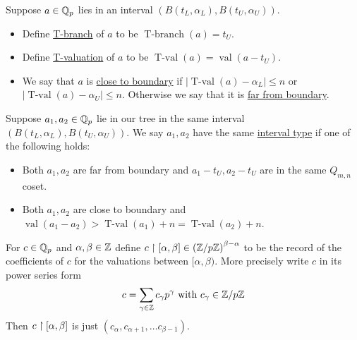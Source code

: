 \documentclass{amsart}
\newcommand{\paren}[1]{\left(#1\right)}
\DeclareMathOperator{\vval}{val}
\DeclareMathOperator{\tval}{T-val}
\DeclareMathOperator{\tbr}{T-branch}
\newcommand{\defn}{\underline}
\begin{document}
\begin{Definition}
  Suppose $a \in \mathbb{Q}_p$ lies in an interval $\paren{B(t_L, \alpha_L),  B(t_U, \alpha_U)}$.
  \begin{itemize}
  \item Define \defn{T-branch} of $a$ to be $\tbr(a) = t_U$.    
  \item Define \defn{T-valuation} of $a$ to be $\tval(a) = \vval(a - t_U)$.    
  \item We say that $a$ is \defn{close to boundary} if $|\tval(a) - \alpha_L| \leq n$ or $|\tval(a) - \alpha_U| \leq n$.
    Otherwise we say that it is \defn{far from boundary}.
  \end{itemize}      
\end{Definition}

\begin{Definition}
  Suppose $a_1, a_2 \in \mathbb{Q}_p$ lie in our tree in the same interval $\paren{B(t_L, \alpha_L),  B(t_U, \alpha_U)}$.
  We say $a_1, a_2$ have the same \defn{interval type} if one of the following holds:
  \begin{itemize}
  \item Both $a_1, a_2$ are far from boundary and $a_1 - t_U, a_2 - t_U$ are in the same $Q_{m,n}$ coset.
  \item Both $a_1, a_2$ are close to boundary and $\vval(a_1 - a_2) > \tval(a_1) + n = \tval(a_2) + n$.
  \end{itemize}      
\end{Definition}


\begin{Definition}
  For $c \in \mathbb{Q}_p$ and $\alpha, \beta \in \mathbb{Z}$ define $c \midr [\alpha, \beta] \in \paren{\Z/p\Z}^{\beta - \alpha}$
  to be the record of the coefficients of $c$ for the valuations between $[\alpha, \beta)$.
  More precisely write $c$ in its power series form
  \begin{align*}
    c = \sum_{\gamma \in \mathbb{Z}} c_\gamma p^\gamma \text{ with } c_\gamma \in \mathbb{Z}/p\mathbb{Z}
  \end{align*}
  Then $c \upharpoonright [\alpha, \beta]$ is just $(c_\alpha, c_{\alpha+1}, \ldots c_{\beta - 1})$.
\end{Definition}
\end{document}
